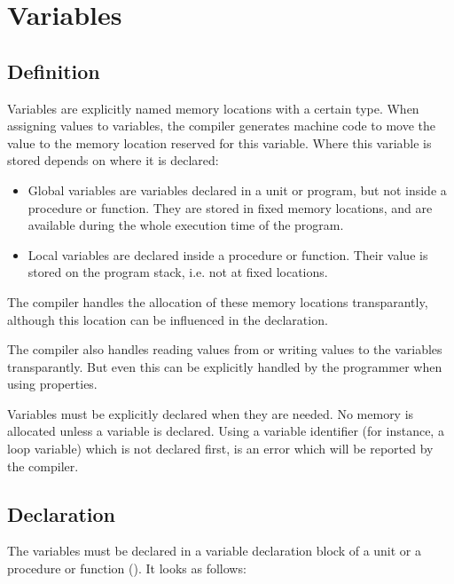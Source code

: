 \chapter{Variables}
\label{ch:Variables}
\section{Definition}
Variables are explicitly named memory locations with a certain type. When
assigning values to variables, the \fpc compiler generates machine code 
to move the value to the memory location reserved for this variable. Where
this variable is stored depends on where it is declared:

\begin{itemize}
\item Global variables are variables declared in a unit or program, but not
inside a procedure or function. They are stored in fixed memory locations,
and are available during the whole execution time of the program.
\item Local variables are declared inside a procedure or function. Their
value is stored on the program stack, i.e. not at fixed locations.
\end{itemize}

The \fpc compiler handles the allocation of these memory locations
transparantly, although this location can be influenced in the declaration.

The \fpc compiler also handles reading values from or writing values to
the variables transparantly. But even this can be explicitly handled by the
programmer when using properties.

Variables must be explicitly declared when they are needed. No memory is
allocated unless a variable is declared. Using a variable identifier (for
instance, a loop variable) which is not declared first, is an error which
will be reported by the compiler. 

\section{Declaration}
The variables must be declared in a variable declaration block of a unit
or a procedure or function (). It looks as follows:



